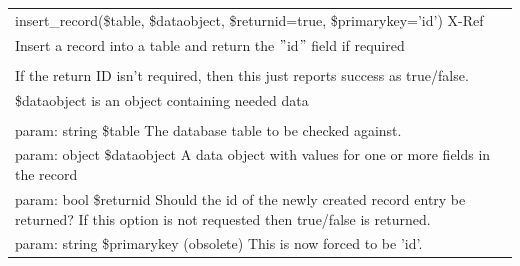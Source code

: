 \documentclass[a4paper]{report}  %
\begin{document}
\begin{tt}
\begin{center}
 	\begin{tabular}{| p{12cm} |}
	\hline
	\rowcolor[gray]{0.5}insert\_record(\$table, \$dataobject, \$returnid=true, \$primarykey='id') X-Ref\\
	Insert a record into a table and return the $"$id$"$ field if required\\
	\hline \\
	If the return ID isn't required, then this just reports success as true/false.\\
	\$dataobject is an object containing needed data\\
	\\
	param: string \$table The database table to be checked against.\\
	param: object \$dataobject A data object with values for one or more fields in the record\\
	param: bool \$returnid Should the id of the newly created record entry be returned? If this option is not requested then true/false is returned.\\
	param: string \$primarykey (obsolete) This is now forced to be 'id'. \\
	\hline
	\end{tabular}
	\     \ \\ \     \ \\
\end{center}
\end{tt}	
\end{document}
